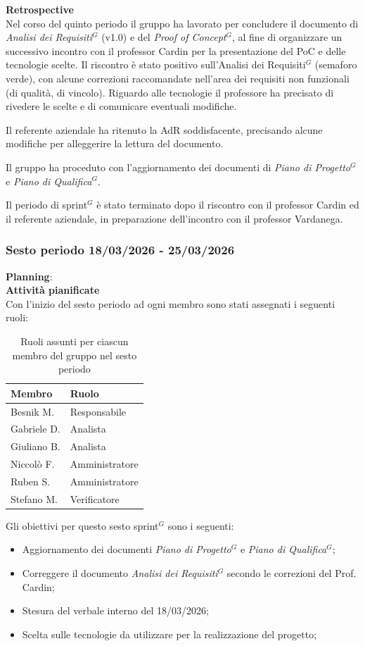 \documentclass[a4paper,10pt]{article}
\begin{document}
\textbf{Retrospective} \\
Nel corso del quinto periodo il gruppo ha lavorato per concludere il documento di \textit{Analisi dei Requisiti$^G$} (v1.0) e del \textit{Proof of Concept$^G$}, al fine di organizzare un successivo incontro con il professor Cardin per la presentazione del PoC e delle tecnologie scelte. Il riscontro è stato positivo sull'Analisi dei Requisiti$^G$ (semaforo verde), con alcune correzioni raccomandate nell'area dei requisiti non funzionali (di qualità, di vincolo). Riguardo alle tecnologie il professore ha precisato di rivedere le scelte e di comunicare eventuali modifiche.

Il referente aziendale ha ritenuto la AdR soddisfacente, precisando alcune modifiche per alleggerire la lettura del documento.

Il gruppo ha proceduto con l'aggiornamento dei documenti di \textit{Piano di Progetto$^G$} e \textit{Piano di Qualifica$^G$}.

Il periodo di sprint$^G$ è stato terminato dopo il riscontro con il professor Cardin ed il referente aziendale, in preparazione dell'incontro con il professor Vardanega.

\subsubsection{Sesto periodo 18/03/2026 - 25/03/2026}
\textbf{Planning}: \\
\textbf{Attività pianificate} \\ Con l'inizio del sesto periodo ad ogni membro sono stati assegnati i seguenti ruoli:
\begin{table}[H]
\centering
\begin{tabular}{|l|l|}
\hline
\textbf{Membro} & \textbf{Ruolo} \\
\hline
Besnik M.  & Responsabile \\
\hline
Gabriele D.  & Analista \\
\hline
Giuliano B. & Analista \\
\hline
Niccolò F. & Amministratore \\
\hline
Ruben S. & Amministratore \\
\hline
Stefano M.  & Verificatore \\
\hline
\end{tabular}
\caption{Ruoli assunti per ciascun membro del gruppo nel sesto periodo}
\end{table}

Gli obiettivi per questo sesto sprint$^G$ sono i seguenti:
\begin{itemize}
  \item Aggiornamento dei documenti \textit{Piano di Progetto$^G$} e \textit{Piano di Qualifica$^G$};
  \item Correggere il documento \textit{Analisi dei Requisiti$^G$} secondo le correzioni del Prof. Cardin;
  \item Stesura del verbale interno del 18/03/2026;
  \item Scelta sulle tecnologie da utilizzare per la realizzazione del progetto;
\end{itemize}
\end{document}
